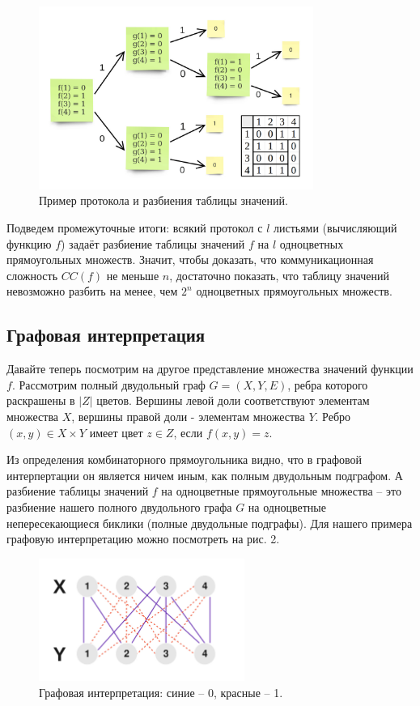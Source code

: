 \documentclass[a4paper]{article}
\begin{document}
\begin{figure}
	\centering
	\includegraphics[width=0.8\textwidth]{images/protocol.png}
	\caption{Пример протокола и разбиения таблицы значений.}
\end{figure}

Подведем промежуточные итоги: всякий протокол с $l$ листьями (вычисляющий функцию $f$) задаёт разбиение
таблицы значений $f$ на $l$ одноцветных прямоугольных множеств. Значит, чтобы доказать, что коммуникационная 
сложность $CC(f)$ не меньше $n$, достаточно показать, что таблицу значений невозможно разбить на менее,
чем $2^n$ одноцветных прямоугольных множеств.

\subsection{Графовая интерпретация}

Давайте теперь посмотрим на другое представление множества значений функции $f$. Рассмотрим полный 
двудольный граф $G = (X, Y, E)$, ребра которого раскрашены в $|Z|$ цветов. Вершины левой доли 
соответствуют элементам множества $X$, вершины правой доли - элементам множества $Y$. Ребро 
$(x, y) \in X\times Y$ имеет цвет $z \in Z$, если $f(x, y) = z$.

Из определения комбинаторного прямоугольника видно, что в графовой интерпертации он является ничем
иным, как полным двудольным подграфом. А разбиение таблицы значений $f$ на одноцветные прямоугольные
множества -- это разбиение нашего  полного двудольного графа $G$ на одноцветные непересекающиеся биклики 
(полные двудольные подграфы). Для нашего примера графовую интерпретацию можно посмотреть на рис. 2.

\begin{figure}
	\centering
	\includegraphics[width=0.6\textwidth]{images/biclique.png}
	\caption{Графовая интерпретация: синие -- 0, красные -- 1.}
\end{figure}
\end{document}
